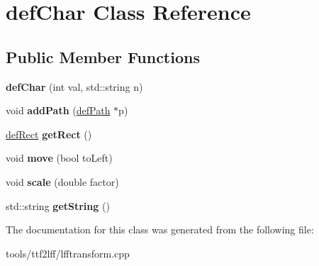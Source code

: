 \hypertarget{classdefChar}{\section{def\-Char Class Reference}
\label{classdefChar}
}
\subsection*{Public Member Functions}
\begin{DoxyCompactItemize}
\item 
\hypertarget{classdefChar_afba4db701302fede44e1cf9dcee2c6fc}{{\bfseries def\-Char} (int val, std\-::string n)}\label{classdefChar_afba4db701302fede44e1cf9dcee2c6fc}

\item 
\hypertarget{classdefChar_acede46d2f4180559e526a2fd5d24962c}{void {\bfseries add\-Path} (\hyperlink{classdefPath}{def\-Path} $\ast$p)}\label{classdefChar_acede46d2f4180559e526a2fd5d24962c}

\item 
\hypertarget{classdefChar_ab72c6d2d4cd2b8b1104692c8be732681}{\hyperlink{classdefRect}{def\-Rect} {\bfseries get\-Rect} ()}\label{classdefChar_ab72c6d2d4cd2b8b1104692c8be732681}

\item 
\hypertarget{classdefChar_a1673d1498b3cfab2f38966dfb75be21a}{void {\bfseries move} (bool to\-Left)}\label{classdefChar_a1673d1498b3cfab2f38966dfb75be21a}

\item 
\hypertarget{classdefChar_a996dac697b3fdf2d56fa699def816194}{void {\bfseries scale} (double factor)}\label{classdefChar_a996dac697b3fdf2d56fa699def816194}

\item 
\hypertarget{classdefChar_adc9c7ebd5974193f49e1b8112ee9c088}{std\-::string {\bfseries get\-String} ()}\label{classdefChar_adc9c7ebd5974193f49e1b8112ee9c088}

\end{DoxyCompactItemize}


The documentation for this class was generated from the following file\-:\begin{DoxyCompactItemize}
\item 
tools/ttf2lff/lfftransform.\-cpp\end{DoxyCompactItemize}
